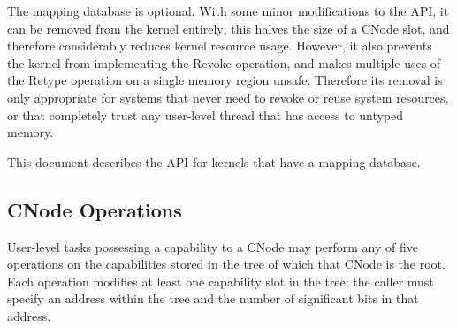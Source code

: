 The mapping database is optional. With some minor modifications to the API, it
can be removed from the kernel entirely; this halves the size of a CNode slot,
and therefore considerably reduces kernel resource usage. However, it also
prevents the kernel from implementing the Revoke operation, and makes multiple
uses of the Retype operation on a single memory region unsafe. Therefore its
removal is only appropriate for systems that never need to revoke or reuse
system resources, or that completely trust any user-level thread that has
access to untyped memory.

This document describes the API for kernels that have a mapping database.

\subsection{CNode Operations}\label{sec:overview.cspace.cnodes}

User-level tasks possessing a capability to a CNode may perform any of five
operations on the capabilities stored in the tree of which that CNode is the
root. Each operation modifies at least one capability slot in the tree; the
caller must specify an address within the tree and the number of significant
bits in that address.

